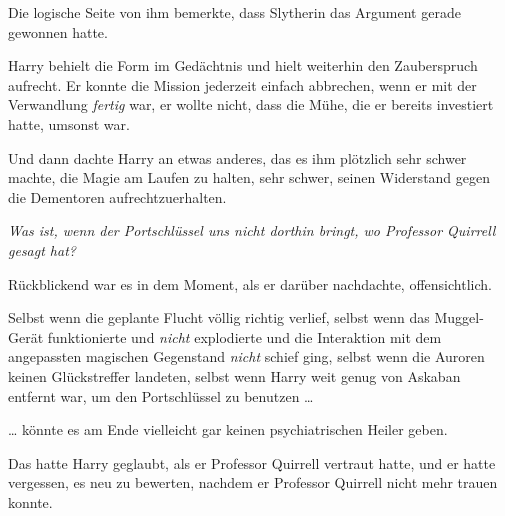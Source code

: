 Die logische Seite von ihm bemerkte, dass Slytherin das Argument gerade gewonnen hatte.

Harry behielt die Form im Gedächtnis und hielt weiterhin den Zauberspruch aufrecht. Er konnte die Mission jederzeit einfach abbrechen, wenn er mit der Verwandlung \emph{fertig} war, er wollte nicht, dass die Mühe, die er bereits investiert hatte, umsonst war.

Und dann dachte Harry an etwas anderes, das es ihm plötzlich sehr schwer machte, die Magie am Laufen zu halten, sehr schwer, seinen Widerstand gegen die Dementoren aufrechtzuerhalten.

\emph{Was ist, wenn der Portschlüssel uns nicht dorthin bringt, wo Professor Quirrell gesagt hat?}

Rückblickend war es in dem Moment, als er darüber nachdachte, offensichtlich.

Selbst wenn die geplante Flucht völlig richtig verlief, selbst wenn das Muggel-Gerät funktionierte und \emph{nicht} explodierte und die Interaktion mit dem angepassten magischen Gegenstand \emph{nicht} schief ging, selbst wenn die Auroren keinen Glückstreffer landeten, selbst wenn Harry weit genug von Askaban entfernt war, um den Portschlüssel zu benutzen …

… könnte es am Ende vielleicht gar keinen psychiatrischen Heiler geben.

Das hatte Harry geglaubt, als er Professor Quirrell vertraut hatte, und er hatte vergessen, es neu zu bewerten, nachdem er Professor Quirrell nicht mehr trauen konnte.

